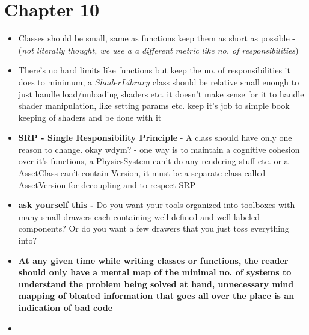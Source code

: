 \documentclass[14pt]{article}
\begin{document}
\section*{Chapter 10}
\begin{itemize}

	\item Classes should be small, same as functions keep them as short as possible - (\textit{not literally thought, we use a a different metric like no. of responsibilities})
	\item There's no hard limits like functions but keep the no. of responsibilities it does to minimum, a $ShaderLibrary$ class should be relative small enough to just handle load/unloading shaders etc. it doesn't make sense for it to handle shader manipulation, like setting params etc. keep it's job to simple book keeping of shaders and be done with it
	\item \textbf{SRP - Single Responsibility Principle} - A class should have only one reason to change. okay wdym? - one way is to maintain a cognitive cohesion over it's functions, a PhysicsSystem can't do any rendering stuff etc. or a AssetClass can't contain Version, it must be a separate class called AssetVersion for decoupling and to respect SRP
	\item \textbf{ask yourself this - } Do you want your tools organized into toolboxes with many small drawers each containing well-defined and well-labeled components? Or do you want a few drawers that you just toss everything into? 
	\item \textbf{At any given time while writing classes or functions, the reader should only have a mental map of the minimal no. of systems to understand the problem being solved at hand, unnecessary mind mapping of bloated information that goes all over the place is an indication of bad code}
	\item 
	
	
\end{itemize}
\end{document}
